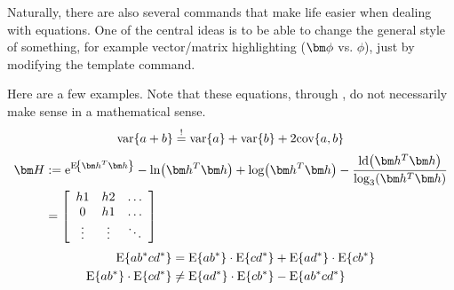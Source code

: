 
Naturally, there are also several commands that make life easier when dealing with equations. One of the central ideas is to be able to change the general style of something, for example vector/matrix highlighting ($\vm{\phi}$ vs. $\phi$), just by modifying the template command.

\nxtpar\noindent
Here are a few examples. Note that these equations,  through , do not necessarily make sense in a mathematical sense.
\begin{equation}
  \text{var}\!\left\{a + b\right\} \mathrel{\stackrel{!}{=}} \text{var}\!\left\{a\right\} + \text{var}\!\left\{b\right\} + 2 \text{cov}\!\left\{a,b\right\}
  \label{eq:fancy:math:1}
\end{equation}
\begin{equation}\begin{split}
  \vm{H}
  &\isdef \exp{\E{\vm{h}^T \vm{h}}} - \ln{\vm{h}^T \vm{h}} + \log{\vm{h}^T \vm{h}} - \frac{\ld{\vm{h}^T \vm{h}}}{\logb{3}{\vm{h}^T \vm{h}}} \\
  &= \mtx{ccc}{h1 & h2 & \dots \\ 0 & h1 & \dots \\ \vdots & \vdots & \ddots}
  \label{eq:fancy:math:2}
\end{split}\end{equation}
\begin{align}
  \E{ a b\conj c d\conj} &= \E{a b\conj} \cdot \E{c d\conj} + \E{a d\conj} \cdot \E{c b\conj} \label{eq:fancy:math:3a}\\
   \E{a b\conj} \cdot \E{c d\conj} &\neq  \E{a d\conj} \cdot \E{c b\conj} - \E{ a b\conj c d\conj}\label{eq:fancy:math:3b}
\end{align}